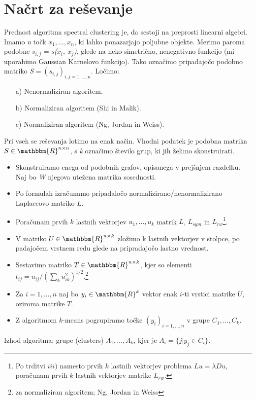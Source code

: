 \documentclass[a4paper, 10pt]{article}
\begin{document}
\section{Načrt za reševanje}
Prednost algoritma spectral clustering je, da sestoji na preprosti linearni algebri. Imamo \textsl{n} točk $x_1,\ldots ,x_n$, ki lahko ponazarjajo poljubne objekte. Merimo paroma podobne  \textsl{$s_{i,j}$} =  \textsl{s($x_i$, $x_j$)}, glede na neko simetrično, nenegativno funkcijo (mi uporabimo Gaussian Karnelovo funkcijo). Tako označimo pripadajočo podobno matriko $S=(s_{i,j})_{i,j = 1,..., n}$. Ločimo:
\begin{itemize}
\item[a)] Nenormaliziran algoritem.
\item[b)] Normaliziran algoritem (Shi in Malik).
\item[c)] Normaliziran algoritem (Ng, Jordan in Weiss).
\end{itemize}
Pri vseh se reševanja lotimo na enak način. Vhodni podatek je podobna matrika $S\in\mathbbm{ R}^{n\times n}$, s  \textsl{k} označimo število grup, ki jih želimo skonstruirati.
\begin{itemize}
\item Skonstruiramo enega od podobnih grafov, opisanega v prejšnjem razdelku. Naj bo \textsl{W} njegova utežena matrika sosednosti. 
\item Po formulah izračunamo pripadaločo normalizirano/nenormalizirano Laplaceovo matriko $L$.
\item Poračunam prvih $k$ lastnih vektorjev $u_{1},\ldots,u_{k}$ matrik $L$, $L_{sym}$ in $L_{rw}$\footnote{Po trditvi $iii)$ namesto prvih $k$ lastnih vektorjev problema $Lu=\lambda Du$, poračunam prvih $k$ lastnih vektorjev matrike $L_{rw}$.}.
\item V matriko $U$ $\in \mathbbm{R}^{n \times k}$ zložimo k lastnih vektorjev v stolpce, po padajočem vrstnem redu glede na pripradajočo lastno vrednost.
\item Sestavimo matriko $T\in \mathbbm{R}^{n\times k}$, kjer so elementi $t_{ij}=u_{ij}/(\sum_{k}u_{ik}^2)^{1/2}.$\footnote{za normaliziran algoritem; Ng, Jordan in Weiss}
\item Za $i=1,\ldots,n$ naj bo $y_{i}\in\mathbbm{R}^k$ vektor enak $i$-ti vrstici matrike $U$, oziroma matrike $T$.
\item Z algoritmom $k$-means pogrupiramo točke $(y_{i})_{i=1,\ldots,n}$ v grupe $C_{1},\ldots,C_{k}$.
\end{itemize}
Izhod algoritma: grupe (clusters)  $A_{1},\ldots, A_{k}$, kjer je $A_{i}=\{j|y_{j}\in C_{i}\}$.
\end{document}
